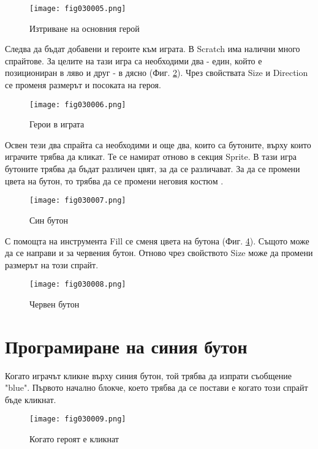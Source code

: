 \begin{figure}[H]
  \centering
  \texttt{[image: fig030005.png]}
  \caption{Изтриване на основния герой}
\label{fig030005}
\end{figure}

Следва да бъдат добавени и героите към играта. В Scratch има налични много спрайтове. За целите на тази игра са необходими два - един, който е позициониран в ляво и друг - в дясно (Фиг. \ref{fig030006}). Чрез свойствата Size и Direction се променя размерът и посоката на героя.

\begin{figure}[H]
  \centering
  \texttt{[image: fig030006.png]}
  \caption{Герои в играта}
\label{fig030006}
\end{figure}

Освен тези два спрайта са необходими и още два, които са бутоните, върху които играчите трябва да кликат. Те се намират отново в секция Sprite. В тази игра бутоните трябва да бъдат различен цвят, за да се различават. За да се промени цвета на бутон, то трябва да се промени неговия костюм .

\begin{figure}[H]
  \centering
  \texttt{[image: fig030007.png]}
  \caption{Син бутон}
\label{fig030007}
\end{figure}

С помощта на инструмента Fill се сменя цвета на бутона (Фиг. \ref{fig030008}). Същото може да се направи и за червения бутон. Отново чрез свойството Size може да промени размерът на този спрайт.

\begin{figure}[H]
  \centering
  \texttt{[image: fig030008.png]}
  \caption{Червен бутон}
\label{fig030008}
\end{figure}

\section{Програмиране на синия бутон}
Когато играчът кликне върху синия бутон, той трябва да изпрати съобщение "blue". Първото начално блокче, което трябва да се постави е когато този спрайт бъде кликнат.

\begin{figure}[H]
  \centering
  \texttt{[image: fig030009.png]}
  \caption{Когато героят е кликнат}
\label{fig030009}
\end{figure}

